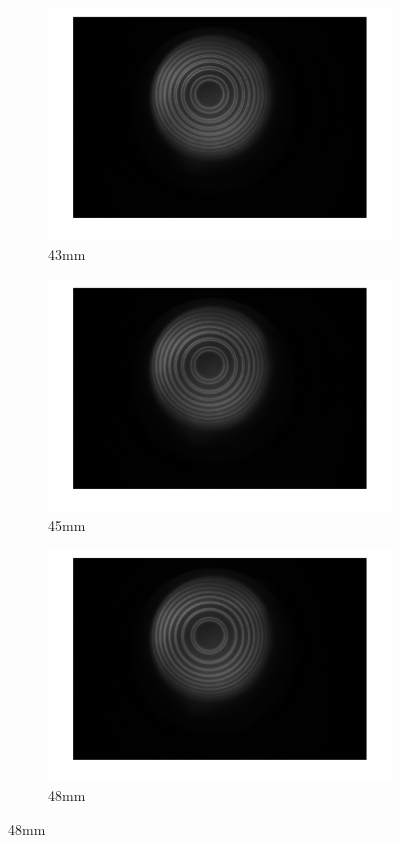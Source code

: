 \documentclass[a4paper,12pt]{article}
\begin{document}
\begin{figure}[H]
      \begin{subfigure}[b]{0.3\textwidth}
        \includegraphics[width=1.2\textwidth]{tra_nor_stripe_43.png}
        \caption{43mm}
      \end{subfigure}
      \hfill
      \begin{subfigure}[b]{0.3\textwidth}
        \includegraphics[width=1.2\textwidth]{tra_nor_stripe_45.png}
        \caption{45mm}
      \end{subfigure}
      \hfill
      \begin{subfigure}[b]{0.3\textwidth}
        \includegraphics[width=1.2\textwidth]{tra_nor_stripe_48.png}
        \caption{48mm}
      \end{subfigure}
    

\end{figure}
\end{document}
